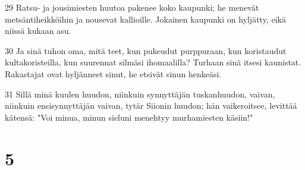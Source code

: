 \par 29 Ratsu- ja jousimiesten huutoa pakenee koko kaupunki; he menevät metsäntiheikköihin ja nousevat kallioille. Jokainen kaupunki on hyljätty, eikä niissä kukaan asu.
\par 30 Ja sinä tuhon oma, mitä teet, kun pukeudut purppuraan, kun koristaudut kultakoristeilla, kun suurennat silmäsi ihomaalilla? Turhaan sinä itsesi kaunistat. Rakastajat ovat hyljänneet sinut, he etsivät sinun henkeäsi.
\par 31 Sillä minä kuulen huudon, niinkuin synnyttäjän tuskanhuudon, vaivan, niinkuin ensisynnyttäjän vaivan, tytär Siionin huudon; hän vaikeroitsee, levittää kätensä: "Voi minua, minun sieluni menehtyy murhamiesten käsiin!"

\chapter{5}

